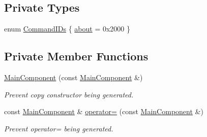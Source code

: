 \subsection*{Private Types}
\begin{CompactItemize}
\item 
enum \hyperlink{class_main_component_9d7ddc68ebc8f05ba8c6004bd2b538f7}{CommandIDs} \{ \hyperlink{class_main_component_9d7ddc68ebc8f05ba8c6004bd2b538f7030b25978873cede4c60b51ab1985961}{about} =  0x2000
 \}
\subsection*{Private Member Functions}
\begin{CompactItemize}
\item 
\hyperlink{class_main_component_56c264d7765c7463f4c9c0ca7d21e709}{MainComponent} (const \hyperlink{class_main_component}{MainComponent} \&)
\begin{CompactList}\small\item\em Prevent copy constructor being generated. \item\end{CompactList}\item 
const \hyperlink{class_main_component}{MainComponent} \& \hyperlink{class_main_component_2527fa926f11b2bb58038e17ac11148c}{operator=} (const \hyperlink{class_main_component}{MainComponent} \&)
\begin{CompactList}\small\item\em Prevent operator= being generated. \item\end{CompactList}\end{CompactItemize}

\end{CompactItemize}
